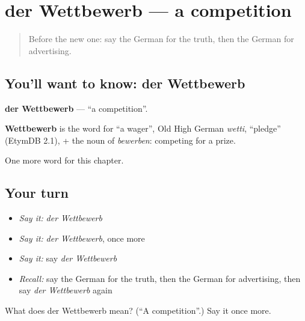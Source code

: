 \section[der Wettbewerb]{der Wettbewerb — a competition}

\label{lesson:GE-C243-wettbewerb}



\begin{quote}
Before the new one: say the German for the truth, then the German for advertising.
\end{quote}

\subsection*{You'll want to know: der Wettbewerb}
\textbf{der Wettbewerb} — \textquotedblleft{}a competition\textquotedblright{}.

\begin{cousinweb}
\textbf{Wettbewerb} is the word for \textquotedblleft{}a wager\textquotedblright{}, Old High German \emph{wetti}, \textquotedblleft{}pledge\textquotedblright{} (EtymDB 2.1), + the noun of \emph{bewerben}: competing for a prize.
\end{cousinweb}

\begin{grammarlens}[title={What you've built}]
One more word for this chapter.
\end{grammarlens}

\subsection*{Your turn}
\begin{itemize}
\raggedright
  \item \emph{Say it:} \emph{der Wettbewerb}
  \item \emph{Say it:} \emph{der Wettbewerb}, once more
  \item \emph{Say it:} say \emph{der Wettbewerb}
  \item \emph{Recall:} say the German for the truth, then the German for advertising, then say \emph{der Wettbewerb} again
\end{itemize}

\begin{tcolorbox}[breakable,colback=teal!4,colframe=teal!35!black,title={Before you move on}]
What does der Wettbewerb mean? (\textquotedblleft{}A competition\textquotedblright{}.) Say it once more.
\end{tcolorbox}
